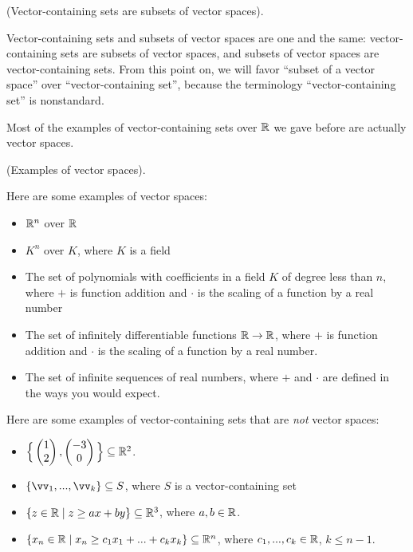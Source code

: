 \begin{remark}
    (Vector-containing sets are subsets of vector spaces).

    Vector-containing sets and subsets of vector spaces are one and the same: vector-containing sets are subsets of vector spaces, and subsets of vector spaces are vector-containing sets. From this point on, we will favor ``subset of a vector space'' over ``vector-containing set'', because the terminology ``vector-containing set'' is nonstandard.
\end{remark}

Most of the examples of vector-containing sets over $\mathbb{R}$ we gave before are actually vector spaces.

\begin{remark}
    (Examples of vector spaces).
    
    Here are some examples of vector spaces:
    
    \begin{itemize}
        \item $\mathbb{R}^n$ over $\mathbb{R}$
        \item $K^n$ over $K$, where $K$ is a field
        \item The set of polynomials with coefficients in a field $K$ of degree less than $n$, where $+$ is function addition and $\cdot$ is the scaling of a function by a real number
        \item The set of infinitely differentiable functions $\mathbb{R} \rightarrow \mathbb{R}$, where $+$ is function addition and $\cdot$ is the scaling of a function by a real number.
        \item The set of infinite sequences of real numbers, where $+$ and $\cdot$ are defined in the ways you would expect.
    \end{itemize}
    
    Here are some examples of vector-containing sets that are \textit{not} vector spaces:
    
    \begin{itemize}
        \item $\Big\{\begin{pmatrix} 1 \\ 2 \end{pmatrix}, \begin{pmatrix} -3 \\ 0 \end{pmatrix}\Big\} \subseteq \mathbb{R}^2$.
        \item $\{\vv_1, ..., \vv_k\} \subseteq S$, where $S$ is a vector-containing set
        \item $\{ z \in \mathbb{R} \mid z \geq ax + by \} \subseteq \mathbb{R}^3$, where $a, b \in \mathbb{R}$.
        \item $\{ x_n \in \mathbb{R} \mid x_n \geq c_1 x_1 + ... + c_k x_k \} \subseteq \mathbb{R}^n$, where $c_1, ..., c_k \in \mathbb{R}$, $k \leq n - 1$.
    \end{itemize}
\end{remark}

